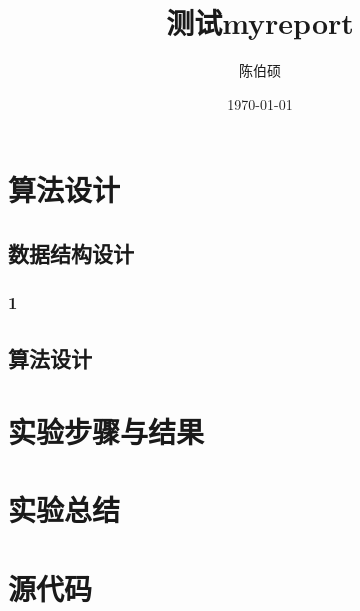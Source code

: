 \documentclass[pdfCover]{myreport} %
\title{测试myreport}
\author{陈伯硕}
\date{\today}
\begin{document}
\maketitle
\pagestyle{empty}

\setcounter{section}{3}
\section{算法设计}
  \subsection{数据结构设计}
    \subsubsection{1}
  \subsection{算法设计}
\section{实验步骤与结果}
\section{实验总结}
\section{源代码}



% 
\end{document}
